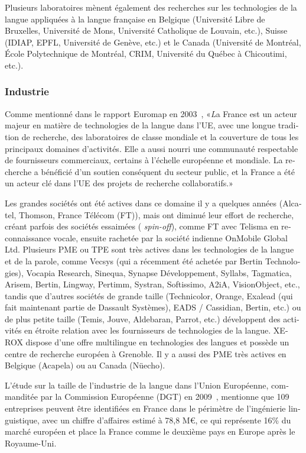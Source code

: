 \begin{french}
\begin{multicols}{2}
Plusieurs laboratoires mènent également des recherches sur les
technologies de la langue appliquées à la langue française en Belgique
(Université Libre de Bruxelles, Université de Mons, Université
Catholique de Louvain, etc.), Suisse (IDIAP, EPFL, Université de
Genève, etc.) et le Canada (Université de Montréal, École
Polytechnique de Montréal, CRIM, Université du Québec à Chicoutimi,
etc.).

\subsubsection{Industrie}

Comme mentionné dans le rapport Euromap en 2003~\cite{euromap}, «{\textit La
France est un acteur majeur en matière de technologies de la langue
dans l'UE, avec une longue tradition de recherche, des laboratoires de
classe mondiale et la couverture de tous les principaux domaines
d'activités. Elle a aussi nourri une communauté respectable de
fournisseurs commerciaux, certains à l'échelle européenne et
mondiale. La recherche a bénéficié d'un soutien conséquent du secteur
public, et la France a été un acteur clé dans l'UE des projets de
recherche collaboratifs.}»

Les grandes sociétés ont été actives dans ce domaine il y a quelques
années (Alcatel, Thomson, France Télécom (FT)), mais ont diminué leur
effort de recherche, créant parfois des sociétés essaimées ({\em
  spin-off}), comme FT avec Telisma en reconnaissance vocale, ensuite
rachetée par la société indienne OnMobile Global Ltd. Plusieurs PME ou
TPE sont très actives dans les technologies de la langue et de la
parole, comme Vecsys (qui a récemment été achetée par Bertin
Technologies), Vocapia Research, Sinequa, Synapse Développement,
Syllabs, Tagmatica, Arisem, Bertin, Lingway, Pertimm, Systran,
Softissimo, A2iA, VisionObject, etc., tandis que d'autres
sociétés de grande taille (Technicolor, Orange, Exalead (qui fait
maintenant partie de Dassault Systèmes), EADS / Cassidian, Bertin,
etc.) ou de plus petite taille (Temis, Jouve, Aldebaran, Parrot, etc.)
développent des activités en étroite relation avec les fournisseurs de
technologies de la langue. XEROX dispose d'une offre multilingue en
technologies des langues et possède un centre de recherche européen à
Grenoble. Il y a aussi des PME très actives en Belgique (Acapela) ou
au Canada (Nüecho).

L'étude sur la taille de l'industrie de la langue dans l'Union
Européenne, commanditée par la Commission Européenne (DGT) en
2009~\cite{dgt08}, mentionne que 109 entreprises peuvent être
identifiées en France dans le périmètre de l'ingénierie linguistique,
avec un chiffre d'affaires estimé à 78,8 M€, ce qui représente 16\% du
marché européen et place la France comme le deuxième pays en
Europe après le Royaume-Uni.


\end{multicols}
\end{french}
